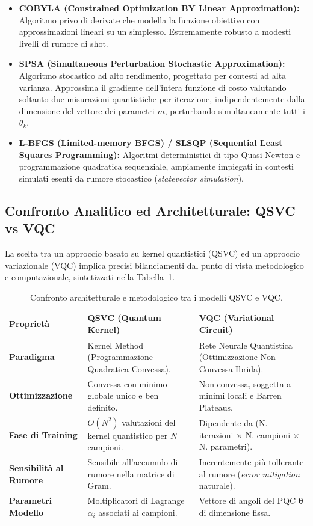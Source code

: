 \begin{itemize}
    \item \textbf{COBYLA (Constrained Optimization BY Linear Approximation):} Algoritmo privo di derivate che modella la funzione obiettivo con approssimazioni lineari su un simplesso. Estremamente robusto a modesti livelli di rumore di shot.
    \item \textbf{SPSA (Simultaneous Perturbation Stochastic Approximation):} Algoritmo stocastico ad alto rendimento, progettato per contesti ad alta varianza. Approssima il gradiente dell'intera funzione di costo valutando soltanto due misurazioni quantistiche per iterazione, indipendentemente dalla dimensione del vettore dei parametri $m$, perturbando simultaneamente tutti i $\theta_k$.
    \item \textbf{L-BFGS (Limited-memory BFGS) / SLSQP (Sequential Least Squares Programming):} Algoritmi deterministici di tipo Quasi-Newton e programmazione quadratica sequenziale, ampiamente impiegati in contesti simulati esenti da rumore stocastico (\textit{statevector simulation}).
\end{itemize}

\subsection{Confronto Analitico ed Architetturale: QSVC vs VQC}
La scelta tra un approccio basato su kernel quantistici (QSVC) ed un approccio variazionale (VQC) implica precisi bilanciamenti dal punto di vista metodologico e computazionale, sintetizzati nella Tabella~\ref{tab:confronto_qsvc_vqc}.

\begin{table}[htbp]
\centering
\caption{Confronto architetturale e metodologico tra i modelli QSVC e VQC.}
\label{tab:confronto_qsvc_vqc}
\small
\renewcommand{\arraystretch}{1.2}
\begin{tabularx}{\textwidth}{l|X|X}
\hline
\textbf{Proprietà} & \textbf{QSVC (Quantum Kernel)} & \textbf{VQC (Variational Circuit)} \\
\hline
\textbf{Paradigma} & Kernel Method (Programmazione Quadratica Convessa). & Rete Neurale Quantistica (Ottimizzazione Non-Convessa Ibrida). \\
\textbf{Ottimizzazione} & Convessa con minimo globale unico e ben definito. & Non-convessa, soggetta a minimi locali e Barren Plateaus. \\
\textbf{Fase di Training} & $O(N^2)$ valutazioni del kernel quantistico per $N$ campioni. & Dipendente da (N. iterazioni $\times$ N. campioni $\times$ N. parametri). \\
\textbf{Sensibilità al Rumore} & Sensibile all'accumulo di rumore nella matrice di Gram. & Inerentemente più tollerante al rumore (\textit{error mitigation} naturale). \\
\textbf{Parametri Modello} & Moltiplicatori di Lagrange $\alpha_i$ associati ai campioni. & Vettore di angoli del PQC $\boldsymbol{\theta}$ di dimensione fissa. \\
\hline
\end{tabularx}
\end{table}

